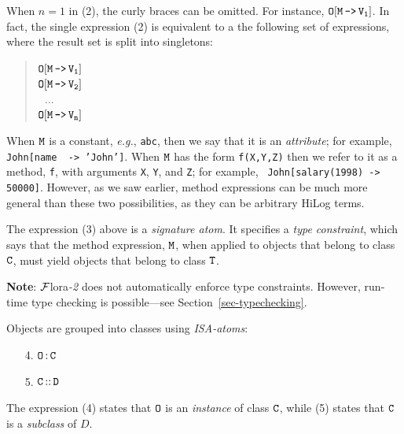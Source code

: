 \documentclass[11pt]{article}
\newcommand{\isa}{\,{\bf{:}}\,}
\newcommand{\subcl}{\,{\bf{::}}\,}
\newcommand{\mvd}{{\mbox{\tt \,->\,}}}  %
\newcommand{\FLORA}{{\mbox{\sc ${\cal F}${lora}\rm\emph{-2}}}\xspace}
\newcommand{\fl}{\mbox{F-logic}\xspace}
\begin{document}
\begin{itemize}
  When $n=1$ in (2), the curly braces can be omitted. For
  instance, $\tt O[M\mvd V_1]$. In fact, the single expression (2) is
  equivalent to a the following set of expressions, where the result set is
  split into singletons:
  \begin{quote}
  $\tt O[M\mvd V_1]$    \\
  $\tt O[M\mvd V_2]$    \\
  $~~~\dots$\\
  $\tt O[M\mvd V_n]$
  \end{quote}
  
  When $\tt M$ is a constant, {\it e.g.}, {\tt abc}, then we say that it is
  an \emph{attribute}; for example, {\tt John[name \mvd 'John']}. When $\tt
  M$ has the form {\tt f(X,Y,Z)} then we refer to it as a method, {\tt f},
  with arguments {\tt X}, {\tt Y}, and {\tt Z}; for example, {\tt
  John[salary(1998)\mvd 50000]}.  However, as we saw
  earlier, method expressions can be much more general than these two
  possibilities, as they can be arbitrary HiLog terms.


  \medskip

  \index{signature!in \fl}
  The expression (3) above is a \emph{signature atom}. It specifies a
  \emph{type constraint}, which says
  that the method expression, $\tt M$, when applied to objects that belong
  to class $\tt C$, must yield objects that belong to class $\tt T$.

  {\bf Note}: \FLORA does not automatically enforce type constraints.
  However, run-time type checking is possible---see
  Section~\ref{sec-typechecking}.
  
  \medskip

  Objects are grouped into classes using \emph{ISA-atoms}:
  \medskip

  \begin{enumerate}
  \item[4.] $\tt O\isa C$
  \item[5.] \label{eq-subclass} $\tt C\subcl D$
  \end{enumerate}

  The expression (4) states that $\tt O$ is an \emph{instance} of class $\tt C$,
  while (5) states that $\tt C$ is a \emph{subclass} of $D$.


\end{itemize}
\end{document}
